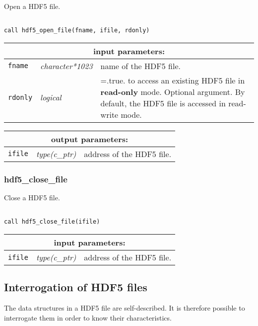 Open a HDF5 file.
\begin{verbatim}

call hdf5_open_file(fname, ifile, rdonly)
\end{verbatim}

\noindent
\begin{tabular}{|p{1.5cm}|p{3cm}|p{10cm}|}
\hline
\multicolumn{3}{|c|}{\bf input parameters:} \\
\hline
{\tt fname} & {\it character*1023} & name of the HDF5 file. \\
\hline
{\tt rdonly} & {\it logical} & =.true. to access an existing HDF5 file in {\bf read-only} mode. Optional argument.
By default, the HDF5 file is accessed in read-write mode. \\ 
\hline
\end{tabular}

\vskip 0.8cm

\noindent
\begin{tabular}{|p{1.5cm}|p{3cm}|p{10cm}|}
\hline
\multicolumn{3}{|c|}{\bf output parameters:} \\
\hline
{\tt ifile} & {\it type(c\_ptr)} & address of the HDF5 file. \\
\hline
\end{tabular}

\subsubsection{hdf5\_close\_file}

Close a HDF5 file.

\begin{verbatim}

call hdf5_close_file(ifile)
\end{verbatim}

\noindent
\begin{tabular}{|p{1.5cm}|p{3cm}|p{10cm}|}
\hline
\multicolumn{3}{|c|}{\bf input parameters:} \\
\hline
{\tt ifile} & {\it type(c\_ptr)} & address of the HDF5 file. \\
\hline
\end{tabular}

\vskip 0.8cm

\subsection{Interrogation of HDF5 files}

The data structures in a HDF5 file are self-described. It is therefore possible to
interrogate them in order to know their characteristics.

